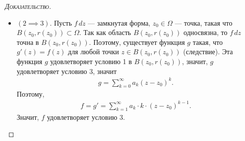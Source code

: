 \documentclass[../complex-analysis.tex]{subfiles}
\begin{document}
\begin{proof}[\normalfont\textsc{Доказательство}]
\begin{itemize}
\item $ (2 \implies 3) $. Пусть $ f\,dz $ --- замкнутая форма, $ z_0 \in \Omega $ --- точка, такая что $ B(z_0, r(z_0)) \subset \Omega $. Так как область $ B(z_0, r(z_0)) $ односвязна, то $ f\,dz $ точна в $ B(z_0, r(z_0)) $. Поэтому, существует функция $ g $ такая, что $ g'(z) = f(z) $ для любой точки $ z \in B(z_0, r(z_0)) $ (следствие). Эта функция $ g $ удовлетворяет условию 1 в $ B(z_0, r(z_0)) $, значит, $ g $ удовлетворяет условию $ 3 $, значит
 \begin{align*}
  g = \sum_{k=0}^{\infty}a_k(z-z_0)^{k}.
 \end{align*} Поэтому,
 \begin{align*}
  f = g' = \sum_{k=1}^{\infty}a_k \cdot k \cdot (z-z_0)^{k-1}.
 \end{align*} Значит, $ f $ удовлетворяет условию 3. 
 \end{itemize}
\end{proof}
\end{document}
